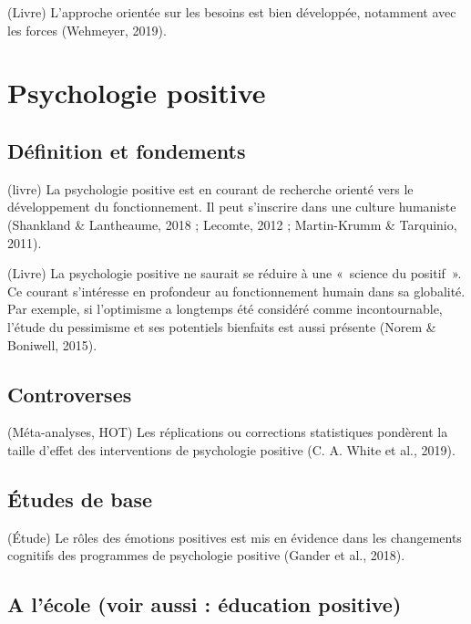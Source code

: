 \documentclass[
  french,
]{article}
\begin{document}
(Livre) L'approche orientée sur les besoins est bien développée, notamment avec les forces (Wehmeyer, 2019).

\hypertarget{psychologie-positive}{%
\section{Psychologie positive}\label{psychologie-positive}}

\hypertarget{duxe9finition-et-fondements}{%
\subsection{Définition et fondements}\label{duxe9finition-et-fondements}}

(livre) La psychologie positive est en courant de recherche orienté vers le développement du fonctionnement. Il peut s'inscrire dans une culture humaniste (Shankland \& Lantheaume, 2018 ; Lecomte, 2012 ; Martin-Krumm \& Tarquinio, 2011).

(Livre) La psychologie positive ne saurait se réduire à une «~science du positif~». Ce courant s'intéresse en profondeur au fonctionnement humain dans sa globalité. Par exemple, si l'optimisme a longtemps été considéré comme incontournable, l'étude du pessimisme et ses potentiels bienfaits est aussi présente (Norem \& Boniwell, 2015).

\hypertarget{controverses}{%
\subsection{Controverses}\label{controverses}}

(Méta-analyses, HOT) Les réplications ou corrections statistiques pondèrent la taille d'effet des interventions de psychologie positive (C. A. White et al., 2019).

\hypertarget{uxe9tudes-de-base}{%
\subsection{Études de base}\label{uxe9tudes-de-base}}

(Étude) Le rôles des émotions positives est mis en évidence dans les changements cognitifs des programmes de psychologie positive (Gander et al., 2018).

\hypertarget{a-luxe9cole-voir-aussi-uxe9ducation-positive}{%
\subsection{A l'école (voir aussi : éducation positive)}\label{a-luxe9cole-voir-aussi-uxe9ducation-positive}}
\end{document}
